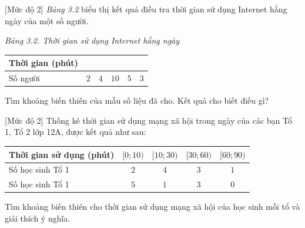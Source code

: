 \begin{bt}%
[Mức độ 2]
{\it Bảng 3.2} biểu thị kết quả điều tra thời gian sử dụng Internet hằng ngày của một số người.
\begin{center}
	{\it Bảng 3.2. Thời gian sử dụng Internet hằng ngày}
	\begin{tabular}{|p{4cm}|p{2cm}|p{2cm}|p{2cm}|p{2cm}|p{2cm}|}
		\hline Thời gian (phút) &\centering\arraybackslash {$[30;60)$} &\centering\arraybackslash {$[60;90)$} &\centering\arraybackslash {$[90;120)$} &\centering\arraybackslash {$[120;150)$} &\centering\arraybackslash {$[150;180)$} \\
		\hline Số người &\centering\arraybackslash $2$ &\centering\arraybackslash $4$ &\centering\arraybackslash $10$ &\centering\arraybackslash $5$ &\centering\arraybackslash $3$ \\
		\hline
	\end{tabular}
\end{center}
Tìm khoảng biến thiên của mẫu số liệu đã cho. Kết quả cho biết điều gì?
\end{bt}

\begin{bt}%
[Mức độ 2]
	Thống kê thời gian sử dụng mạng xã hội trong ngày của các bạn Tổ 1, Tổ 2 lớp 12A, được kết quả như sau:
	\begin{center}
		\begin{tabular}{|l|c|c|c|c|}
			\hline
			Thời gian sử dụng (phút) & $[0;10 )$ & $[ 10;30)$ &$[30;60 )$ & $[60;90)$ \\
			\hline
			Số học sinh Tổ 1 & $2$ & $4$ & $3$ & $1$ \\
			\hline
			Số học sinh Tổ 1 & $5$ & $1$ & $3$ & $0$ \\
			\hline
		\end{tabular}
	\end{center}
	Tìm khoảng biến thiên cho thời gian sử dụng mạng xã hội của học sinh mỗi tổ và giải thích ý nghĩa.
\end{bt}


